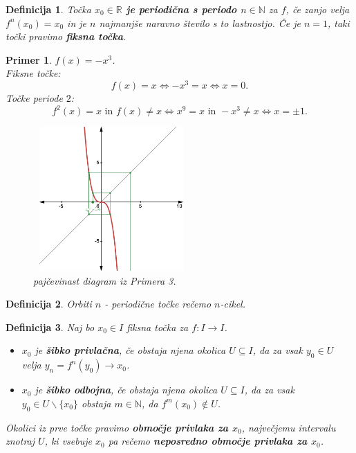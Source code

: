 \documentclass{article}
\newtheorem{definicija}{Definicija}
\newtheorem{primer}{Primer}
\newcommand{\N}{\mathbb{N}}
\newcommand{\R}{\mathbb{R}}
\begin{document}
\begin{definicija}
Točka \textbf{$x_0 \in \R$ je periodična s periodo $n\in \N$} za $f$, če zanjo velja $f^n(x_0) = x_0$ in je $n$ najmanjše naravno število s to lastnostjo. Če je $n=1$, taki točki pravimo \textbf{fiksna točka}.
\end{definicija}

\begin{primer}
$f(x) = -x^3$. \\ 
Fiksne točke: 
$$f(x) = x \iff -x^3 = x \iff x = 0.$$ 
Točke periode $2$: $$f^2(x) = x \text{ in } f(x) \neq x \iff x^9 = x \text{ in } -x^3 \neq x\iff x = \pm 1.$$

\begin{figure}[h!]
    \begin{centering}
        \includegraphics[width=6cm, height=5.5cm]{Grafi/cobweb3.png}
        \caption{pajčevinast diagram iz Primera 3.}
    \end{centering}
    \end{figure}    
\end{primer}

\begin{definicija}
Orbiti $n$ - periodične točke rečemo $n$-cikel.
\end{definicija}

\newpage
\begin{definicija}
Naj bo $x_0 \in I$ fiksna točka za $f:I \rightarrow I$.
\begin{itemize}
\item $x_0$ je \textbf{šibko privlačna}, če obstaja njena okolica $U\subseteq I$, da za vsak $y_0 \in U$ velja $y_n = f^n(y_0) \rightarrow x_0$.
\item $x_0$ je \textbf{šibko odbojna}, če obstaja njena okolica $U\subseteq I$, da za vsak $y_0 \in U\backslash\{x_0\}$ obstaja $m\in \N$, da $f^m(x_0) \not\in U$.
\end{itemize}
Okolici iz prve točke pravimo \textbf{območje privlaka za $x_0$}, največjemu intervalu znotraj $U$, ki vsebuje $x_0$ pa rečemo \textbf{neposredno območje privlaka za $x_0$}.\\ 
\end{definicija}
\end{document}
